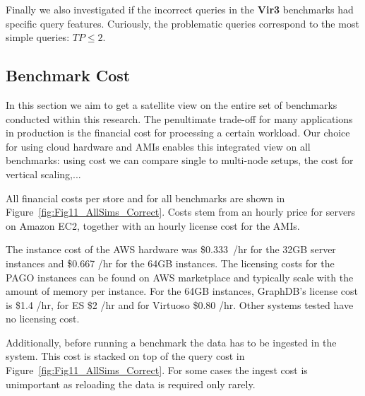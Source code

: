 \documentclass[twocolumn]{bmcart}%
\begin{document}
Finally we also investigated if the incorrect queries in the \textbf{Vir3} benchmarks had specific query features. Curiously, the problematic queries correspond to the most simple queries: $TP \leq 2$.	



\subsection{Benchmark Cost}
\label{sec:bmcost}
%

%

In this section we aim to get a satellite view on the entire set of benchmarks conducted within this research. The penultimate trade-off for many applications in production is the financial cost for processing a certain workload. Our choice for using cloud hardware and AMIs enables this integrated view on all benchmarks: using cost we can compare single to multi-node setups, the cost for vertical scaling,... 

All financial costs per store and for all benchmarks are shown in Figure~\ref{fig:Fig11_AllSims_Correct}. 
Costs stem from an hourly price for servers on Amazon EC2, together with an hourly license cost for the AMIs.

The instance cost of the AWS hardware was \mbox{\$0.333 /hr} for the 32GB server instances and \$0.667 /hr for the 64GB instances. The licensing costs for the PAGO instances can be found on AWS marketplace and typically scale with the amount of memory per instance. For the 64GB instances, GraphDB's license cost is \$1.4 /hr, for ES \$2 /hr and for Virtuoso \$0.80 /hr. Other systems tested have no licensing cost.

Additionally, before running a benchmark the data has to be ingested in the system. This cost is stacked on top of the query cost in Figure~\ref{fig:Fig11_AllSims_Correct}. For some cases the ingest cost is unimportant as reloading the data is required only rarely.
\end{document}
